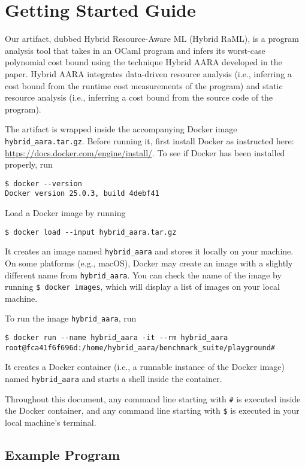 
\section{Getting Started Guide}

Our artifact, dubbed Hybrid Resource-Aware ML (Hybrid RaML), is a program analysis tool
that takes in an OCaml program and infers its worst-case polynomial cost bound
using the technique Hybrid AARA developed in the paper.
%
Hybrid AARA integrates data-driven resource analysis (i.e., inferring a cost
bound from the runtime cost measurements of the program) and static resource
analysis (i.e., inferring a cost bound from the source code of the program).

The artifact is wrapped inside the accompanying Docker image
\texttt{hybrid\_aara.tar.gz}.
%
Before running it, first install Docker as instructed here:
\url{https://docs.docker.com/engine/install/}.
%
To see if Docker has been installed properly, run
\begin{verbatim}
$ docker --version
Docker version 25.0.3, build 4debf41
\end{verbatim}

Load a Docker image by running
\begin{verbatim}
$ docker load --input hybrid_aara.tar.gz
\end{verbatim}
%
It creates an image named \texttt{hybrid\_aara} and stores it locally on your
machine.
%
On some platforms (e.g., macOS), Docker may create an image with a slightly
different name from \texttt{hybrid\_aara}.
%
You can check the name of the image by running \verb|$ docker images|, which
will display a list of images on your local machine.

To run the image \texttt{hybrid\_aara}, run
\begin{verbatim}
$ docker run --name hybrid_aara -it --rm hybrid_aara
root@fca41f6f696d:/home/hybrid_aara/benchmark_suite/playground#
\end{verbatim}
%
It creates a Docker container (i.e., a runnable instance of the Docker image)
named \texttt{hybrid\_aara} and starts a shell inside the container.

Throughout this document, any command line starting with \texttt{\#} is executed
inside the Docker container, and any command line starting with \texttt{\$} is
executed in your local machine's terminal.

\subsection{Example Program}

